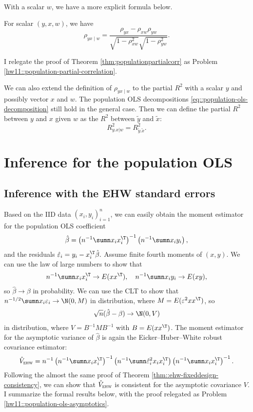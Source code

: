 With a scalar $w$, we have a more explicit formula below.
\begin{theorem}
\label{thm:populationpartialcorr}For scalar $(y,x,w)$, we have
\[
\rho_{yx\mid w}=\frac{\rho_{yx}-\rho_{xw}\rho_{yw}}{\sqrt{1-\rho_{xw}^{2}}\sqrt{1-\rho_{yw}^{2}}}.
\]
\end{theorem}


I relegate the proof of Theorem \ref{thm:populationpartialcorr} as  Problem \ref{hw11::population-partial-correlation}.


We can also extend the definition of $\rho_{yx\mid w}$ to the partial $R^2$ with a scalar $y$ and possibly vector $x$ and $w$. The population OLS decompositions \eqref{eq::population-ols-decomposition} still hold in the general case. Then we can define the partial $R^2$ between $y$ and $x$ given $w$ as the $R^2$ between $ \tilde{y}$ and $  \tilde{x}$: 
$$
R^2_{y.x|w} = R^2_{ \tilde{y}.  \tilde{x}  } . 
$$



 
 

\section{Inference for the population OLS}


\subsection{Inference with the EHW standard errors}
Based on the IID data $(x_{i},y_{i})_{i=1}^{n}$, we can easily
obtain the moment estimator for the population OLS coefficient
\[
\hat{\beta}=\left(n^{-1}\sumn x_{i}x_{i}^{\T}\right)^{-1}\left(n^{-1}\sumn x_{i}y_{i}\right),
\]
and the residuals $ \hat{\varepsilon}_i = y_i - x_i^{\T} \hat{\beta} . $ Assume finite fourth moments of $(x,y)$. We can use the law of large numbers to show that 
$$
n^{-1}\sumn x_{i}x_{i}^{\T}\rightarrow E(xx^{\T}),\quad
n^{-1}\sumn x_{i}y_{i}\rightarrow E(xy) ,
$$
so $\hat{\beta}\rightarrow\beta$ in probability. We can use the CLT to show that $n^{-1/2}\sumn x_{i}\varepsilon_{i}\rightarrow\N(0,M)$ in distribution, where $M= E(\varepsilon^{2}xx^{\T})$,
so 
\begin{eqnarray}
\label{eq::ols-populationols-clt}
\sqrt{n}(\hat{\beta}-\beta)\rightarrow\N ( 0, V  )
\end{eqnarray}
in distribution, where $V =  B^{-1} M B^{-1}$ with $B =   E(xx^{\T}) $. 
The moment estimator for the asymptotic variance of $\hat{\beta}$ is again
 the Eicker--Huber--White robust covariance
estimator:
\begin{eqnarray}
\label{eq::ehw-populationols}
\hat{V}_{\textsc{ehw}} =  
n^{-1}
\left(n^{-1}\sumn x_{i}x_{i}^{\T}\right)^{-1}
\left(n^{-1}\sumn  \hat{\varepsilon}_i^2  x_{i}x_{i}^{\T}\right) 
\left(n^{-1}\sumn x_{i}x_{i}^{\T}\right)^{-1} .
\end{eqnarray}
Following the almost the same proof of Theorem \ref{thm::ehw-fixeddesign-consistency}, we can show that $\hat{V}_{\textsc{ehw}} $ is consistent for the asymptotic covariance $V$. I summarize the formal results below, with the proof relegated as Problem \ref{hw11::population-ols-asymptotics}. 




